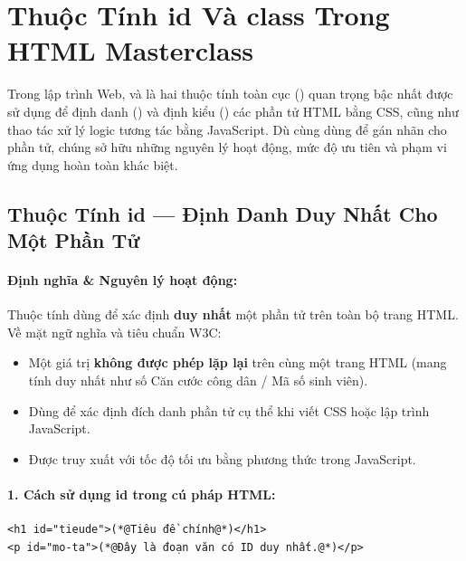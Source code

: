 \Needspace*{80pt}
\section{Thuộc Tính id Và class Trong HTML Masterclass}
\label{sec:html_id_class_masterclass}

Trong lập trình Web,  và  là hai thuộc tính toàn cục () quan trọng bậc nhất được sử dụng để định danh () và định kiểu () các phần tử HTML bằng CSS, cũng như thao tác xử lý logic tương tác bằng JavaScript. Dù cùng dùng để gán nhãn cho phần tử, chúng sở hữu những nguyên lý hoạt động, mức độ ưu tiên và phạm vi ứng dụng hoàn toàn khác biệt.

\subsection{Thuộc Tính id --- Định Danh Duy Nhất Cho Một Phần Tử}

\paragraph{Định nghĩa \& Nguyên lý hoạt động:}
Thuộc tính  dùng để xác định \textbf{duy nhất} một phần tử trên toàn bộ trang HTML. Về mặt ngữ nghĩa và tiêu chuẩn W3C:
\begin{itemize}[leftmargin=1.8em, itemsep=3pt, parsep=0pt]
    \item Một giá trị  \textbf{không được phép lặp lại} trên cùng một trang HTML (mang tính duy nhất như số Căn cước công dân / Mã số sinh viên).
    \item Dùng để xác định đích danh phần tử cụ thể khi viết CSS hoặc lập trình JavaScript.
    \item Được truy xuất với tốc độ tối ưu bằng phương thức  trong JavaScript.
\end{itemize}

\paragraph{1. Cách sử dụng id trong cú pháp HTML:}
\begin{codeWindow}
\begin{lstlisting}[language=HTML5]
<h1 id="tieude">(*@Tiêu đề chính@*)</h1>
<p id="mo-ta">(*@Đây là đoạn văn có ID duy nhất.@*)</p>
\end{lstlisting}
\end{codeWindow}

